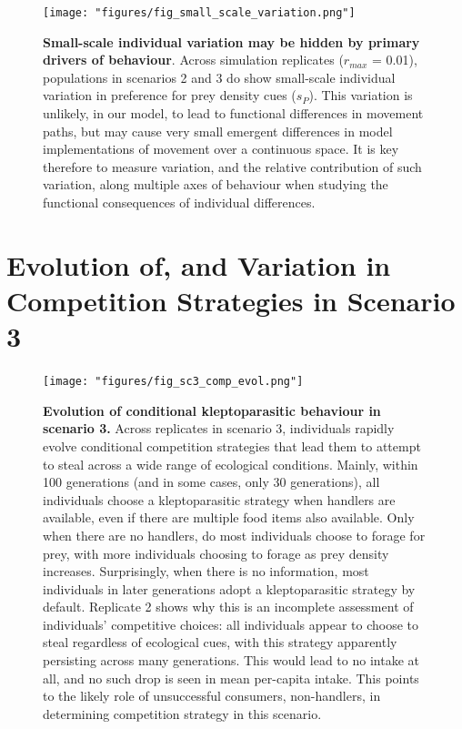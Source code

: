 \documentclass[]{article}
\begin{document}
\begin{figure}
\centering
\texttt{[image: "figures/fig\_small\_scale\_variation.png"]}
\caption{\textbf{Small-scale individual variation may be hidden by primary drivers of behaviour}. Across simulation replicates (\(r_{max}\) = 0.01), populations in scenarios 2 and 3 do show small-scale individual variation in preference for prey density cues (\(s_P\)). This variation is unlikely, in our model, to lead to functional differences in movement paths, but may cause very small emergent differences in model implementations of movement over a continuous space. It is key therefore to measure variation, and the relative contribution of such variation, along multiple axes of behaviour when studying the functional consequences of individual differences.}
\end{figure}

\newpage

\hypertarget{evolution-of-and-variation-in-competition-strategies-in-scenario-3}{%
\section{Evolution of, and Variation in Competition Strategies in Scenario 3}\label{evolution-of-and-variation-in-competition-strategies-in-scenario-3}}

\begin{figure}
\centering
\texttt{[image: "figures/fig\_sc3\_comp\_evol.png"]}
\caption{\textbf{Evolution of conditional kleptoparasitic behaviour in scenario 3.} Across replicates in scenario 3, individuals rapidly evolve conditional competition strategies that lead them to attempt to steal across a wide range of ecological conditions. Mainly, within 100 generations (and in some cases, only 30 generations), all individuals choose a kleptoparasitic strategy when handlers are available, even if there are multiple food items also available. Only when there are no handlers, do most individuals choose to forage for prey, with more individuals choosing to forage as prey density increases. Surprisingly, when there is no information, most individuals in later generations adopt a kleptoparasitic strategy by default. Replicate 2 shows why this is an incomplete assessment of individuals' competitive choices: all individuals appear to choose to steal regardless of ecological cues, with this strategy apparently persisting across many generations. This would lead to no intake at all, and no such drop is seen in mean per-capita intake. This points to the likely role of unsuccessful consumers, non-handlers, in determining competition strategy in this scenario.}
\end{figure}
\end{document}
